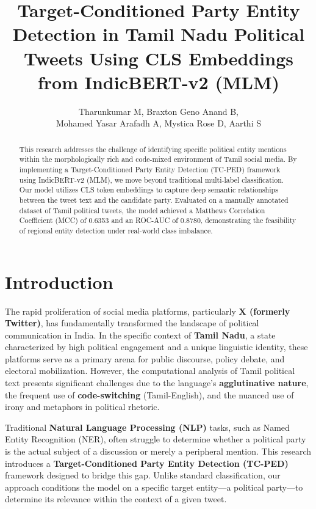 \documentclass[12pt,a4paper]{article}
\title{\textbf{Target-Conditioned Party Entity Detection in Tamil Nadu Political Tweets Using CLS Embeddings from IndicBERT-v2 (MLM)}}
\author{Tharunkumar M, Braxton Geno Anand B, \\ Mohamed Yasar Arafadh A, Mystica Rose D, Aarthi S}
\begin{document}
\maketitle

\begin{abstract}
This research addresses the challenge of identifying specific political entity mentions within the morphologically rich and code-mixed environment of Tamil social media. By implementing a Target-Conditioned Party Entity Detection (TC-PED) framework using IndicBERT-v2 (MLM), we move beyond traditional multi-label classification. Our model utilizes CLS token embeddings to capture deep semantic relationships between the tweet text and the candidate party. Evaluated on a manually annotated dataset of Tamil political tweets, the model achieved a Matthews Correlation Coefficient (MCC) of 0.6353 and an ROC-AUC of 0.8780, demonstrating the feasibility of regional entity detection under real-world class imbalance.
\end{abstract}


\newpage
\tableofcontents
\newpage

\section{Introduction}
The rapid proliferation of social media platforms, particularly \textbf{X (formerly Twitter)}, has fundamentally transformed the landscape of political communication in India. In the specific context of \textbf{Tamil Nadu}, a state characterized by high political engagement and a unique linguistic identity, these platforms serve as a primary arena for public discourse, policy debate, and electoral mobilization. However, the computational analysis of Tamil political text presents significant challenges due to the language's \textbf{agglutinative nature}, the frequent use of \textbf{code-switching} (Tamil-English), and the nuanced use of irony and metaphors in political rhetoric.

Traditional \textbf{Natural Language Processing (NLP)} tasks, such as Named Entity Recognition (NER), often struggle to determine whether a political party is the actual subject of a discussion or merely a peripheral mention. This research introduces a \textbf{Target-Conditioned Party Entity Detection (TC-PED)} framework designed to bridge this gap. Unlike standard classification, our approach conditions the model on a specific target entity—a political party—to determine its relevance within the context of a given tweet.
\end{document}

